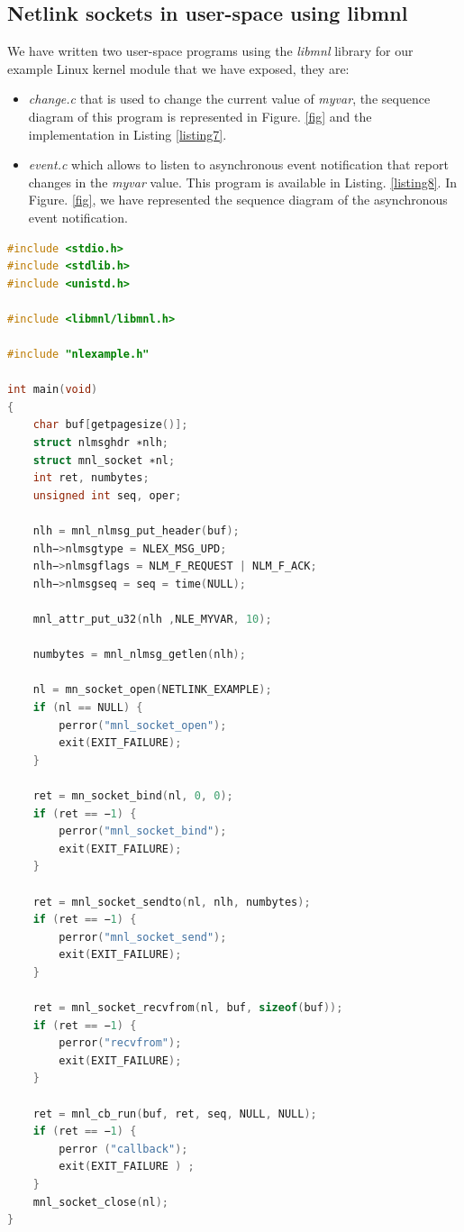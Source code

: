 \documentclass[10pt,onecolumn]{article}
\begin{document}
\subsection{Netlink sockets in user-space using libmnl}

We have written two user-space programs using the \textit{libmnl} library for our example Linux kernel module that we have exposed, they are:

\begin{itemize}
  \item \textit{change.c} that is used to change the current value of \textit{myvar}, the sequence diagram of this program is represented in Figure. \ref{fig} and the implementation in Listing \ref{listing7}.
  \item \textit{event.c} which allows to listen to asynchronous event notification that report changes in the \textit{myvar} value. This program is available in Listing. \ref{listing8}. In Figure. \ref{fig}, we have represented the sequence diagram of the asynchronous event notification.
\end{itemize}

\begin{lstlisting}[language=C, caption=\textit{change.c} program, label=listing7]
#include <stdio.h>
#include <stdlib.h>
#include <unistd.h>

#include <libmnl/libmnl.h>

#include "nlexample.h"

int main(void)
{
    char buf[getpagesize()];
    struct nlmsghdr ∗nlh;
    struct mnl_socket ∗nl;
    int ret, numbytes;
    unsigned int seq, oper;

    nlh = mnl_nlmsg_put_header(buf);
    nlh−>nlmsgtype = NLEX_MSG_UPD;
    nlh−>nlmsgflags = NLM_F_REQUEST | NLM_F_ACK;
    nlh−>nlmsgseq = seq = time(NULL);

    mnl_attr_put_u32(nlh ,NLE_MYVAR, 10);

    numbytes = mnl_nlmsg_getlen(nlh);

    nl = mn_socket_open(NETLINK_EXAMPLE);
    if (nl == NULL) {
        perror("mnl_socket_open");
        exit(EXIT_FAILURE);
    }

    ret = mn_socket_bind(nl, 0, 0);
    if (ret == −1) {
        perror("mnl_socket_bind");
        exit(EXIT_FAILURE);
    }

    ret = mnl_socket_sendto(nl, nlh, numbytes);
    if (ret == −1) {
        perror("mnl_socket_send");
        exit(EXIT_FAILURE);
    }

    ret = mnl_socket_recvfrom(nl, buf, sizeof(buf));
    if (ret == −1) {
        perror("recvfrom");
        exit(EXIT_FAILURE);
    }

    ret = mnl_cb_run(buf, ret, seq, NULL, NULL);
    if (ret == −1) {
        perror ("callback");
        exit(EXIT_FAILURE ) ;
    }
    mnl_socket_close(nl);
}
\end{lstlisting}
\end{document}
